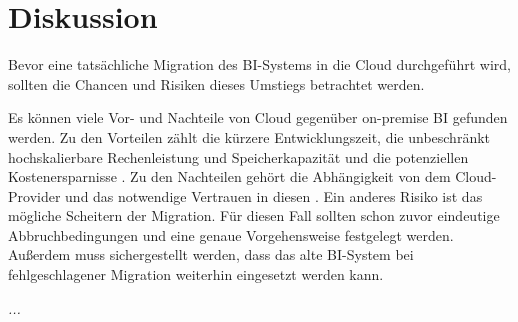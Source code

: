 \chapter{Diskussion} \label{ch:diskussion}
Bevor eine tatsächliche Migration des BI-Systems in die Cloud durchgeführt wird, sollten die Chancen und Risiken dieses Umstiegs betrachtet werden.

Es können viele Vor- und Nachteile von Cloud gegenüber on-premise BI gefunden werden. Zu den Vorteilen zählt die kürzere Entwicklungszeit, die unbeschränkt hochskalierbare Rechenleistung und Speicherkapazität und die potenziellen Kostenersparnisse \cite{ouf_cloud_2011}. Zu den Nachteilen gehört die Abhängigkeit von dem Cloud-Provider und das notwendige Vertrauen in diesen \cite{menon_business_2012}. Ein anderes Risiko ist das mögliche Scheitern der Migration. Für diesen Fall sollten schon zuvor eindeutige Abbruchbedingungen und eine genaue Vorgehensweise festgelegt werden. Außerdem muss sichergestellt werden, dass das alte BI-System bei fehlgeschlagener Migration weiterhin eingesetzt werden kann.

\textit{...}